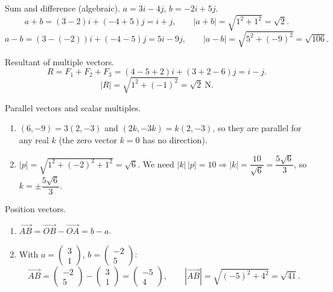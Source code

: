 \documentclass[11pt]{article}
\def\textbf#1{#1}%
\def\mathbf#1{#1}%
\begin{document}
\begin{solution}
\textbf{Sum and difference (algebraic).}
$\mathbf{a}=3\mathbf{i}-4\mathbf{j}$, $\mathbf{b}=-2\mathbf{i}+5\mathbf{j}$.
\[
\mathbf{a}+\mathbf{b}=(3-2)\mathbf{i}+(-4+5)\mathbf{j}=\mathbf{i}+\mathbf{j},\qquad
|\mathbf{a}+\mathbf{b}|=\sqrt{1^2+1^2}=\sqrt{2}.
\]
\[
\mathbf{a}-\mathbf{b}=(3-(-2))\mathbf{i}+(-4-5)\mathbf{j}=5\mathbf{i}-9\mathbf{j},\qquad
|\mathbf{a}-\mathbf{b}|=\sqrt{5^2+(-9)^2}=\sqrt{106}.
\]
\end{solution}

\begin{solution}
\textbf{Resultant of multiple vectors.}
\[
\mathbf{R}=\mathbf{F}_1+\mathbf{F}_2+\mathbf{F}_3=(4-5+2)\mathbf{i}+(3+2-6)\mathbf{j}
=\mathbf{i}-\mathbf{j}.
\]
\[
|\mathbf{R}|=\sqrt{1^2+(-1)^2}=\sqrt{2}\ \text{N}.
\]
\end{solution}

\begin{solution}
\textbf{Parallel vectors and scalar multiples.}
\begin{enumerate}
  \item $(6,-9)=3(2,-3)$ and $(2k,-3k)=k(2,-3)$, so they are parallel for any real $k$ (the zero vector $k=0$ has no direction).
  \item $|\mathbf{p}|=\sqrt{1^2+(-2)^2+1^2}=\sqrt{6}$. We need $|k|\,|\mathbf{p}|=10\Rightarrow |k|=\dfrac{10}{\sqrt{6}}=\dfrac{5\sqrt{6}}{3}$, so $k=\pm\dfrac{5\sqrt{6}}{3}$.
\end{enumerate}
\end{solution}

\begin{solution}
\textbf{Position vectors.}
\begin{enumerate}
  \item $\overrightarrow{AB}=\overrightarrow{OB}-\overrightarrow{OA}=\mathbf{b}-\mathbf{a}$.
  \item With $\mathbf{a}=\begin{pmatrix}3\\1\end{pmatrix}$, $\mathbf{b}=\begin{pmatrix}-2\\5\end{pmatrix}$:
  \[
  \overrightarrow{AB}=\begin{pmatrix}-2\\5\end{pmatrix}-\begin{pmatrix}3\\1\end{pmatrix}
  =\begin{pmatrix}-5\\4\end{pmatrix},\qquad
  |\overrightarrow{AB}|=\sqrt{(-5)^2+4^2}=\sqrt{41}.
  \]
\end{enumerate}
\end{solution}
\end{document}
